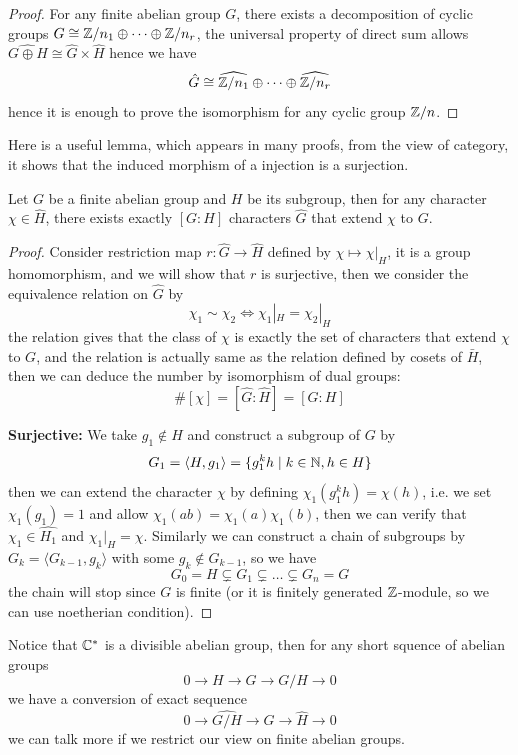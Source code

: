 \begin{proof}
    For any finite abelian group \(G\), there exists a decomposition of cyclic groups \(G \cong \mathbb{Z}/n_1 \oplus \cdots \oplus \mathbb{Z}/n_r\), the universal property of direct sum allows \(\widehat{G \oplus H} \cong \widehat{G} \times \widehat{H}\) hence we have
    \[\hat{G} \cong \widehat{\mathbb{Z}/n_1}\oplus \cdots \oplus \widehat{\mathbb{Z}/n_{r}}\]
    hence it is enough to prove the isomorphism for any cyclic group \(\mathbb{Z}/n\).
\end{proof}

Here is a useful lemma, which appears in many proofs, from the view of category, it shows that the induced morphism of a injection is a surjection.
\begin{lemma}
    Let \(G\) be a finite abelian group and \(H\) be its subgroup, then for any character \(\chi \in \hat{H}\), there exists exactly \([G:H]\) characters \(\hat{G}\) that extend \(\chi\) to \(G\).
\end{lemma}
\begin{proof}
    Consider restriction map \(r: \hat{G} \to \hat{H}\) defined by \(\chi \mapsto \chi|_H\), it is a group homomorphism, and we will show that \(r\) is surjective, then we consider the equivalence relation on \(\hat{G}\) by
    \[\chi_1 \sim \chi_2 \iff \chi_1|_H = \chi_2|_H\]
    the relation gives that the class of \(\chi\) is exactly the set of characters that extend \(\chi\) to \(G\), and the relation is actually same as the relation defined by cosets of \(\bar{H}\), then we can deduce the number by isomorphism of dual groups:
    \[\#[\chi] = [\hat{G}:\hat{H}] = [G:H]\]

    \textbf{Surjective:} We take \(g_1 \notin H\) and construct a subgroup of \(G\) by
    \[G_1 = \langle H,g_1 \rangle = \{g_1^kh \mid k\in \mathbb{N}, h \in H\}\]
    then we can extend the character \(\chi\) by defining \(\chi_1(g_1^kh) = \chi(h)\), i.e. we set \(\chi_1(g_1) = 1\) and allow \(\chi_1(ab) = \chi_1(a)\chi_1(b)\), then we can verify that \(\chi_1 \in \widehat{H_1}\) and \(\chi_1|_H = \chi\). Similarly we can construct a chain of subgroups by \(G_k = \langle G_{k-1},g_k \rangle\) with some \(g_k \notin G_{k-1}\), so we have
    \[G_0 = H \subsetneq G_1 \subsetneq \dots \subsetneq G_n = G\]
    the chain will stop since \(G\) is finite (or it is finitely generated \(\mathbb{Z}\)-module, so we can use noetherian condition).
\end{proof}
\begin{remark}
    Notice that \(\mathbb{C}^*\) is a divisible abelian group, then for any short squence of abelian groups
    \[0 \to H \to G \to G/H \to 0\]
    we have a conversion of exact sequence
    \[0 \to \widehat{G/H} \to \hat{G} \to \hat{H} \to 0\]
    we can talk more if we restrict our view on finite abelian groups.
\end{remark}

